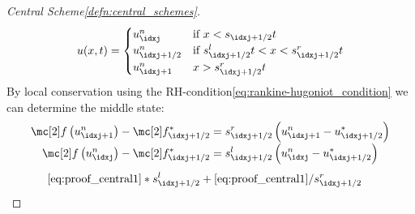 \begin{proofbox}\nospacing
    \begin{proof}[Central Scheme\cref{defn:central_schemes}]\label{proof:defn:central_schemes}
        \begin{align*}
          u(x,t)=
          \begin{cases}
              u_{\idxj}^{n} &\text{if }x<s_{\idxj+1/2}t \\
              u_{\idxj+1/2}^{n}&\text{if }s_{\idxj+1/2}^{l}t<x<s_{\idxj+1/2}^{r}t \\
              u_{\idxj+1}^{n}&x>s_{\idxj+1/2}^{r}t
          \end{cases}
        \end{align*}
        By local conservation using the RH-condition\cref{eq:rankine-hugoniot_condition} we can determine the middle state:
        \begin{align}
          \flux \left(u_{\idxj+1}^{n}\right)-\flux_{\idxj+1/2}^{*}&=s^{r}_{\idxj+1/2}\left(u_{\idxj+1}^{n}-u_{\idxj+1/2}^{*}\right)\label{eq:proof_central1}\\[-1\jot]
          \flux \left(u_{\idxj}^{n}\right)-\flux_{\idxj+1/2}^{*}&=s^{l}_{\idxj+1/2}\left(u_{\idxj}^{n}-u_{\idxj+1/2}^{*}\right)\label{eq:proof_central1}
        \end{align}
        \begin{align*}
            &\cref{eq:proof_central1}*s^{l}_{\idxj+1/2}+\cref{eq:proof_central1}/s^{r}_{\idxj+1/2}
        \end{align*}
    \end{proof}
\end{proofbox}
